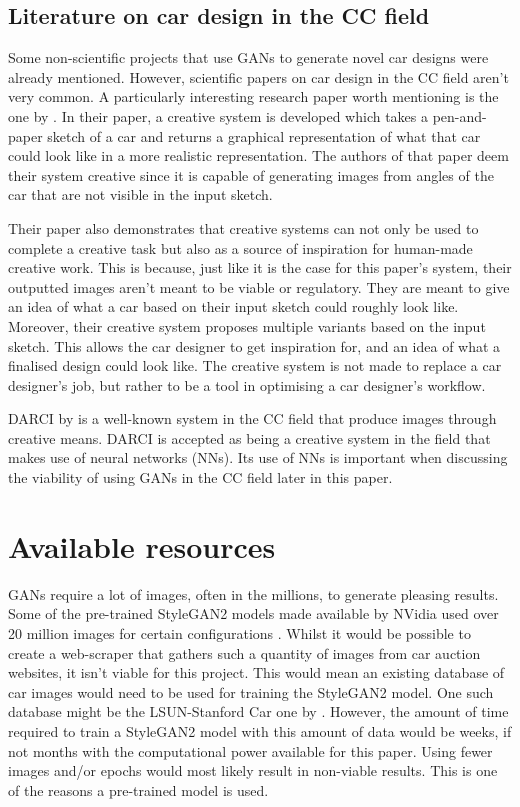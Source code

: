 \clearpage
\subsection{Literature on car design in the CC field}
\label{subsec:relevant_literature_cc}

Some non-scientific projects that use GANs to generate novel car designs were already mentioned.
However, scientific papers on car design in the CC field aren't very common.
A particularly interesting research paper worth mentioning is the one by \citet{creativecargan}.
In their paper, a creative system is developed which takes a pen-and-paper sketch of a car and returns a graphical representation of what that car could look like in a more realistic representation.
The authors of that paper deem their system creative since it is capable of generating images from angles of the car that are not visible in the input sketch.

Their paper also demonstrates that creative systems can not only be used to complete a creative task but also as a source of inspiration for human-made creative work.
This is because, just like it is the case for this paper's system, their outputted images aren't meant to be viable or regulatory.
They are meant to give an idea of what a car based on their input sketch could roughly look like.
Moreover, their creative system proposes multiple variants based on the input sketch.
This allows the car designer to get inspiration for, and an idea of what a finalised design could look like.
The creative system is not made to replace a car designer's job, but rather to be a tool in optimising a car designer's workflow.

DARCI by \citet{darci} is a well-known system in the CC field that produce images through creative means.
DARCI is accepted as being a creative system in the field that makes use of neural networks (NNs).
Its use of NNs is important when discussing the viability of using GANs in the CC field later in this paper.



\section{Available resources}
\label{sec:available_resources}

GANs require a lot of images, often in the millions, to generate pleasing results.
Some of the pre-trained StyleGAN2 models made available by NVidia used over 20 million images for certain configurations \citep{stylegan2}.
Whilst it would be possible to create a web-scraper that gathers such a quantity of images from car auction websites, it isn't viable for this project.
This would mean an existing database of car images would need to be used for training the StyleGAN2 model.
One such database might be the LSUN-Stanford Car one by \citet{cardb}.
However, the amount of time required to train a StyleGAN2 model with this amount of data would be weeks, if not months with the computational power available for this paper.
Using fewer images and/or epochs would most likely result in non-viable results.
This is one of the reasons a pre-trained model is used.

